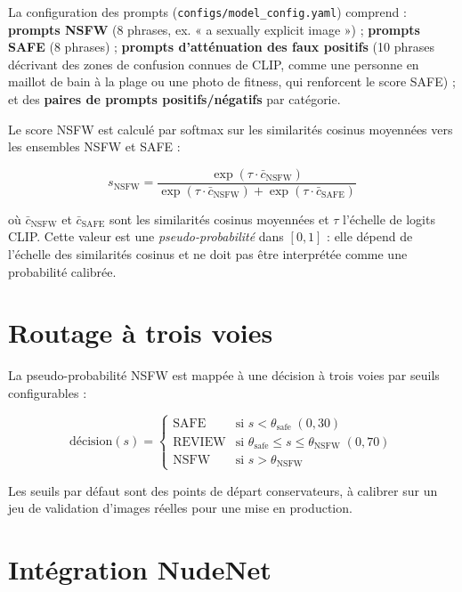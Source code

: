 La configuration des prompts (\texttt{configs/model\_config.yaml}) comprend : \textbf{prompts NSFW} (8 phrases, ex. « a sexually explicit image ») ; \textbf{prompts SAFE} (8 phrases) ; \textbf{prompts d'atténuation des faux positifs} (10 phrases décrivant des zones de confusion connues de CLIP, comme une personne en maillot de bain à la plage ou une photo de fitness, qui renforcent le score SAFE) ; et des \textbf{paires de prompts positifs/négatifs} par catégorie.

Le score NSFW est calculé par softmax sur les similarités cosinus moyennées vers les ensembles NSFW et SAFE :

\begin{equation}
s_{\text{NSFW}} = \frac{\exp(\tau \cdot \bar{c}_{\text{NSFW}})}{\exp(\tau \cdot \bar{c}_{\text{NSFW}}) + \exp(\tau \cdot \bar{c}_{\text{SAFE}})}
\label{eq:nsfw_score}
\end{equation}

où $\bar{c}_{\text{NSFW}}$ et $\bar{c}_{\text{SAFE}}$ sont les similarités cosinus moyennées et $\tau$ l'échelle de logits CLIP. Cette valeur est une \emph{pseudo-probabilité} dans $[0, 1]$ : elle dépend de l'échelle des similarités cosinus et ne doit pas être interprétée comme une probabilité calibrée.

\section{Routage à trois voies}

La pseudo-probabilité NSFW est mappée à une décision à trois voies par seuils configurables :

\begin{equation}
\text{décision}(s) = \begin{cases}
\text{SAFE} & \text{si } s < \theta_{\text{safe}} \;(0{,}30) \\
\text{REVIEW} & \text{si } \theta_{\text{safe}} \leq s \leq \theta_{\text{NSFW}} \;(0{,}70) \\
\text{NSFW} & \text{si } s > \theta_{\text{NSFW}}
\end{cases}
\end{equation}

Les seuils par défaut sont des points de départ conservateurs, à calibrer sur un jeu de validation d'images réelles pour une mise en production.

\section{Intégration NudeNet}

